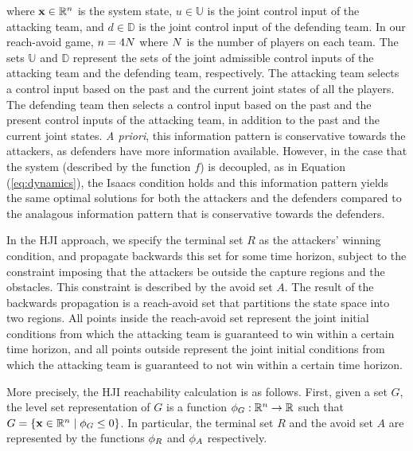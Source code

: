 \noindent where $\mathbf{x}\in\mathbb{R}^n$ is the system state, $u\in\mathbb{U}$ is the joint control input of the attacking team, and $d\in\mathbb{D}$ is the joint control input of the defending team. In our reach-avoid game, $n=4N$ where $N$ is the number of players on each team. The sets $\mathbb{U}$ and $\mathbb{D}$ represent the sets of the joint admissible control inputs of the attacking team and the defending team, respectively. The attacking team selects a control input based on the past and the current joint states of all the players. The defending team then selects a control input based on the past and the present control inputs of the attacking team, in addition to the past and the current joint states. \textit{A priori}, this information pattern is conservative towards the attackers, as defenders have more information available. However, in the case that the system (described by the function $f$) is decoupled, as in Equation (\ref{eq:dynamics}), the Isaacs condition \cite{b:isaacs-1967} holds and this information pattern yields the same optimal solutions for both the attackers and the defenders compared to the analagous information pattern that is conservative towards the defenders.

In the HJI approach, we specify the terminal set $R$ as the attackers' winning condition, and propagate backwards this set for some time horizon, subject to the constraint imposing that the attackers be outside the capture regions and the obstacles. This constraint is described by the avoid set $A$. The result of the backwards propagation is a reach-avoid set that partitions the state space into two regions. All points inside the reach-avoid set represent the joint initial conditions from which the attacking team is guaranteed to win within a certain time horizon, and all points outside represent the joint initial conditions from which the attacking team is guaranteed to not win within a certain time horizon.

More precisely, the HJI reachability calculation is as follows. First, given a set $G$, the level set representation of $G$ is a function $\phi_G:\mathbb{R}^n \rightarrow \mathbb{R}$ such that $G = \left\{\mathbf{x}\in\mathbb{R}^n \mid \phi_G\le0\right\}$. In particular, the terminal set $R$ and the avoid set $A$ are represented by the functions $\phi_R$ and $\phi_A$ respectively.
 
